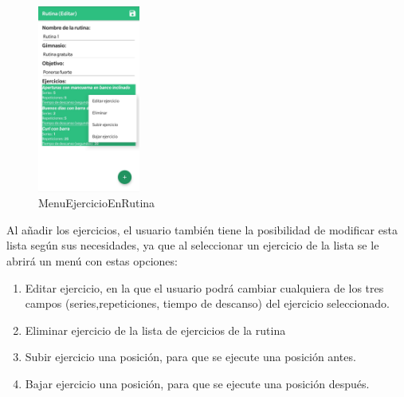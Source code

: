 \documentclass[11pt,a4paper]{report}
\begin{document}
\begin{figure}[H]
	\centering
	\includegraphics[width=0.3\textwidth]{graficos/manual/MenuEjercicioEnRutina.jpg}
	\caption{MenuEjercicioEnRutina}
\end{figure}
Al añadir los ejercicios, el usuario también tiene la posibilidad de modificar esta lista según sus necesidades, ya que al seleccionar un ejercicio de la lista se le abrirá un menú con estas opciones:
\begin{enumerate}
	\item Editar ejercicio, en la que el usuario podrá cambiar cualquiera de los tres campos (series,repeticiones, tiempo de descanso) del ejercicio seleccionado.
	\item Eliminar ejercicio de la lista de ejercicios de la rutina
	\item Subir ejercicio una posición, para que se ejecute una posición antes.

	\item Bajar ejercicio una posición, para que se ejecute una posición después.
\end{enumerate}
\end{document}
